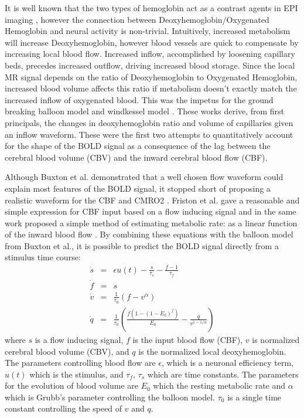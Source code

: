 \documentclass[journal]{./IEEEtran}
\begin{document}
It is well known that the two types of hemoglobin act as a contrast agents in 
EPI imaging \cite{Buxton1998, WEISSKOFF1994, Ogawa}, however the connection
between Deoxyhemoglobin/Oxygenated Hemoglobin and neural activity is non-trivial. 
Intuitively, increased metabolism will increase Deoxyhemoglobin, 
however blood vessels are quick to compensate by increasing local 
blood flow. Increased inflow, accomplished by loosening 
capillary beds, precedes increased outflow, driving increased 
blood storage.  Since the local MR signal depends on the ratio of 
Deoxyhemoglobin to Oxygenated Hemoglobin, increased blood volume 
affects this ratio if metabolism doesn't exactly match the increased 
inflow of oxygenated blood.  This was the impetus
for the ground breaking balloon model \cite{Buxton1998} and windkessel
model \cite{Mandeville1999}. These works derive, from first principals,
the changes in deoxyhemoglobin ratio and volume of capillaries given an 
inflow waveform.  These were the first two attempts to quantitatively 
account for the shape of the BOLD signal as a consequence of the lag 
between the cerebral blood volume (CBV) and the inward cerebral blood 
flow (CBF). 

Although Buxton et al. demonstrated that a well chosen flow waveform could 
explain most features of the BOLD signal, it stopped short of proposing a
realistic waveform for the CBF and CMRO2 \cite{Buxton1998}. Friston et al. 
gave a reasonable and simple expression for CBF input based on a flow 
inducing signal and in the same work proposed a simple method
of estimating metabolic rate: as a linear function of the inward 
blood flow \cite{Friston2000}. By combining these equations with 
the balloon model from Buxton et al., it is possible to predict 
the BOLD signal directly from a stimulus time course:
\begin{eqnarray}
\dot{s} &=& \epsilon u(t) - \frac{s}{\tau_s} - \frac{f - 1}{\tau_f} \\
\dot{f} &=& s\\
\dot{v} &=& \frac{1}{\tau_0}(f - v^\alpha)\\
\dot{q} &=& \frac{1}{\tau_0}(\frac{f(1-(1-E_0)^f)}{E_0} - \frac{q}{v^{1-1/\alpha}})
\label{eq:bold}
\end{eqnarray}
where $s$ is a flow inducing signal, $f$ is the input blood flow (CBF),
$v$ is normalized cerebral blood volume (CBV), and $q$ is the normalized
local deoxyhemoglobin. The parameters controlling blood flow are 
$\epsilon$, which is a neuronal efficiency term, $u(t)$ which is 
the stimulus, and $\tau_f$, $\tau_s$ which are time constants. 
The parameters for the evolution of blood volume are $E_0$ which 
the resting metabolic rate and $\alpha$ which is Grubb's parameter 
controlling the balloon model.  $\tau_0$ is a single time constant 
controlling the speed of $v$ and $q$.
\end{document}
